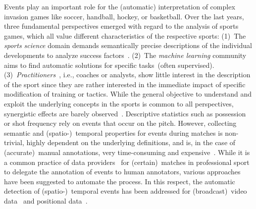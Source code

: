 Events play an important role for the (automatic) interpretation of complex invasion games like soccer, handball, hockey, or basketball.
Over the last years, three fundamental perspectives emerged with regard to the analysis of sports games, which all value different characteristics of the respective sports: 
(1)~The \emph{sports science} domain demands semantically precise descriptions of the individual developments to analyze success factors~\cite{lamas2014invasion}.
(2)~The \emph{machine learning} community aims to find automatic solutions for specific tasks~(often supervised).
(3)~\emph{Practitioners}~, i.e., coaches or analysts, show little interest in the description of the sport since they are rather interested in the immediate impact of specific modification of training or tactics. 
While the general objective to understand and exploit the underlying concepts in the sports is common to all perspectives, synergistic effects are barely observed~\cite{rein2016big}.
Descriptive statistics such as possession or shot frequency rely on events that occur on the pitch.
However, collecting semantic and (spatio-)~temporal properties for events during matches is non-trivial, highly dependent on the underlying definitions, and is, in the case of (accurate)~manual annotations, very time-consuming and expensive~\cite{pappalardo2019public}.
While it is a common practice of data providers~\cite{wyscout, opta, stats} for (certain)~matches in professional sport to delegate the annotation of events to human annotators, 
various approaches have been suggested to automate the process.
In this respect, the automatic detection of (spatio-)~temporal events has been addressed for (broadcast)~video data~\cite{giancola2018soccernet, giancola2021temporally, sarkar2019generation, vats2020event, sanford2020group, sorano2020automatic, hu2020hfnet, yu2019soccer, jiang2016automatic, liu2017soccer, tomei2021rms, karimi2021soccer, mahaseni2021spotting} and positional data~\cite{sanford2020group, xie2020passvizor, khaustov2020recognizing, chacoma2020modeling, richly2016recognizing, richly2017utilizing, morra2020slicing}.


